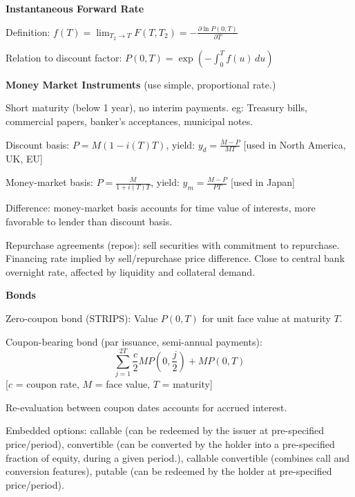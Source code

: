\documentclass[12pt,a4paper]{article}
\begin{document}
\vspace{0.5em}

\textbf{Instantaneous Forward Rate}
\vspace{0.5em}

Definition: $f(T) = \lim_{T_2 \to T} F(T, T_2) = -\frac{\partial \ln P(0,T)}{\partial T}$

Relation to discount factor: $P(0,T) = \exp\left(-\int_0^T f(u) \, du\right)$

\vspace{0.5em}

\textbf{Money Market Instruments} (use simple, proportional rate.)
\vspace{0.5em}

Short maturity (below 1 year), no interim payments. eg: Treasury bills, commercial papers, banker's acceptances, municipal notes.

\vspace{0.3em}

Discount basis: $P = M(1 - i(T)T)$, yield: $y_d = \frac{M-P}{MT}$ [used in North America, UK, EU]

Money-market basis: $P = \frac{M}{1 + i(T)T}$, yield: $y_m = \frac{M-P}{PT}$ [used in Japan]

Difference: money-market basis accounts for time value of interests, more favorable to lender than discount basis.

\vspace{0.3em}

Repurchase agreements (repos): sell securities with commitment to repurchase. Financing rate implied by sell/repurchase price difference. Close to central bank overnight rate, affected by liquidity and collateral demand.

\vspace{0.5em}

\textbf{Bonds}
\vspace{0.5em}

Zero-coupon bond (STRIPS): Value $P(0,T)$ for unit face value at maturity $T$.

Coupon-bearing bond (par issuance, semi-annual payments): 
$$\sum_{j=1}^{2T} \frac{c}{2}MP(0,\frac{j}{2}) + MP(0,T)$$
[$c$ = coupon rate, $M$ = face value, $T$ = maturity]

Re-evaluation between coupon dates accounts for accrued interest.

Embedded options: callable (can be redeemed by the issuer at pre-specified price/period), convertible (can be converted by the holder into a pre-specified fraction 
of equity, during a given period.), callable convertible (combines call and conversion features), putable (can be redeemed by the holder at pre-specified price/period).
\end{document}
